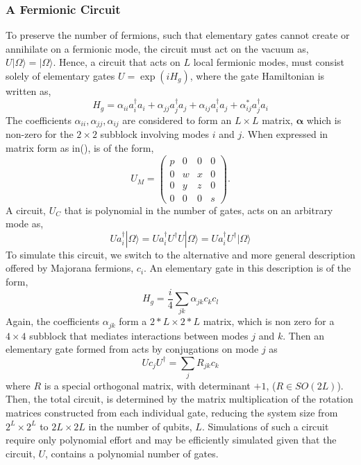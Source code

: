 \subsubsection{A Fermionic Circuit}
To preserve the number of fermions, such that elementary gates cannot create or annihilate on a fermionic mode, the circuit must act on the vacuum as, $U|\Omega\rangle = |\Omega\rangle$. Hence, a circuit that acts on $L$ local fermionic modes, must consist solely of elementary gates $U = \exp(iH_g)$, where the gate Hamiltonian is written as,
\begin{equation}
    H_g = \alpha_{i i} a^{\dagger}_i a_i + \alpha_{j j} a^{\dagger}_j a_j  + \alpha_{i j} a^{\dagger}_i a_j + \alpha^{*}_{i j} a^{\dagger}_j a_i
\end{equation}
The coefficients $\alpha_{i i}, \alpha_{j j}, \alpha_{i j}$ are considered to form an $L\times L $ matrix, $\mathbf{\alpha}$ which is non-zero for the $2\times 2$ subblock involving modes $i$ and $j$. When expressed in matrix form as in(), is of the form, 
\begin{equation}\label{numberpreservinggate}
    U_M = \begin{pmatrix}
        p & 0 & 0 & 0 \\
        0 & w & x & 0 \\
        0 & y & z & 0 \\
        0 & 0 & 0 & s
    \end{pmatrix}.
\end{equation}
A circuit, $U_C$ that is polynomial in the number of gates, acts on an arbitrary mode as, 
\begin{equation}
    U a_i^{\dagger} |\Omega\rangle = U a_i^{\dagger}U^{\dagger} U |\Omega\rangle  = U a_i^{\dagger}U^{\dagger} |\Omega\rangle 
\end{equation}
To simulate this circuit, we switch to the alternative and more general description offered by Majorana fermions, $c_i$. An elementary gate in this description is of the form, 
\begin{equation}\label{majorana}
    H_g = \frac{i}{4} \sum_{jk} \alpha_{jk} c_k c_l
\end{equation}  
Again, the coefficients $\alpha_{jk}$ form a $2*L \times 2*L$ matrix, which is non zero for a $4\times 4$ subblock that mediates interactions between modes $j$ and $k$. Then an elementary gate formed from  acts by conjugations on mode $j$ as 
\begin{equation}\label{majaction}
    U c_j U^\dagger = \sum_{j} R_{jk} c_k
\end{equation}
where $R$ is a special orthogonal matrix, with determinant $+1$, ($R \in SO(2L)$). Then, the total circuit, is determined by the matrix multiplication of the rotation matrices constructed from each individual gate, reducing the system size from $2^L \times 2^L$ to $2L \times 2L$ in the number of qubits, $L$. Simulations of such a circuit require only polynomial effort and may be efficiently simulated given that the circuit, $U$, contains a polynomial number of gates. 


